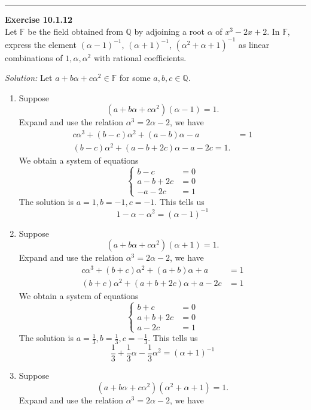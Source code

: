 \documentclass[a4paper, 12pt]{article}
\newenvironment{problem}[2][Exercise]
    { \begin{mdframed}[backgroundcolor=gray!20] \textbf{#1 #2} \\}
    {  \end{mdframed}}
\newenvironment{solution}
    {\textit{Solution:}}
    {}
\begin{document}
\noindent\rule{7in}{2.8pt}
\begin{problem}{10.1.12}
Let \(\mathbb{F}\) be the field obtained from \(\mathbb{Q}\) by adjoining a root \(\alpha\) of \(x^3-2x+2\). In \(\mathbb{F}\), express the element \((\alpha-1)^{-1}\), \((\alpha+1)^{-1}\), \((\alpha^2+\alpha+1)^{-1}\) as 
linear combinations of \(1,\alpha,\alpha^2\) with rational coefficients.
\end{problem}
\begin{solution}
Let \(a+b\alpha+c\alpha^2\in \mathbb{F}\) for some \(a,b,c\in \mathbb{Q}\). 
\begin{enumerate}[(1)]
\item Suppose 
\[(a+b\alpha+c\alpha^2)(\alpha-1)=1.\]
Expand and use the relation \(\alpha^3=2\alpha-2\), we have 
\begin{align*}
	c\alpha^3+(b-c)\alpha^2+(a-b)\alpha-a&=1\\ 
	(b-c)\alpha^2+(a-b+2c)\alpha-a-2c=1.
\end{align*}
We obtain a system of equations
\[\begin{cases}
	b-c&=0\\ 
	a-b+2c&=0\\ 
	-a-2c&=1
\end{cases}\]
The solution is \(a=1,b=-1,c=-1\). This tells us 
\[1-\alpha-\alpha^2=(\alpha-1)^{-1}\]
\item Suppose 
\[(a+b\alpha+c\alpha^2)(\alpha+1)=1.\]
Expand and use the relation \(\alpha^3=2\alpha-2\), we have 
\begin{align*}
	c\alpha^3+(b+c)\alpha^2+(a+b)\alpha+a&=1\\ 
	(b+c)\alpha^2+(a+b+2c)\alpha+a-2c&=1
\end{align*}
We obtain a system of equations 
\[\begin{cases}
	b+c&=0\\ 
	a+b+2c&=0\\ 
	a-2c&=1
\end{cases}\]
The solution is \(a=\frac{1}{3},b=\frac{1}{3},c=-\frac{1}{3}\). This tells us 
\[\frac{1}{3}+\frac{1}{3}\alpha-\frac{1}{3}\alpha^2=(\alpha+1)^{-1}\]
\item Suppose 
\[(a+b\alpha+c\alpha^2)(\alpha^2+\alpha+1)=1.\]
Expand and use the relation \(\alpha^3=2\alpha-2\), we have

\end{enumerate}
\end{solution}
\end{document}
